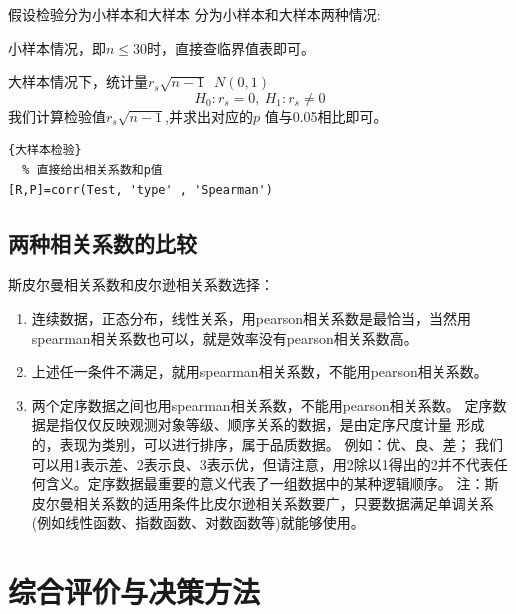 \documentclass[12pt]{ctexart}
\numberwithin{equation}{section} %
\begin{document}
假设检验分为小样本和大样本
分为小样本和大样本两种情况:

小样本情况，即$n\leq30$时，直接查临界值表即可。

大样本情况下，统计量$r_s\sqrt{n-1}$~$N(0,1)$
$$H_0:r_s=0,\:H_1:r_s\neq0$$
我们计算检验值$r_s\sqrt{n-1}$,并求出对应的$p$ 值与0.05相比即可。
\begin{lstlisting}{大样本检验}
  % 直接给出相关系数和p值
[R,P]=corr(Test, 'type' , 'Spearman')
\end{lstlisting}
\subsection{两种相关系数的比较}


斯皮尔曼相关系数和皮尔逊相关系数选择：
\begin{enumerate}
\item 连续数据，正态分布，线性关系，用pearson相关系数是最恰当，当然用
spearman相关系数也可以，就是效率没有pearson相关系数高。
\item 上述任一条件不满足，就用spearman相关系数，不能用pearson相关系数。
\item 两个定序数据之间也用spearman相关系数，不能用pearson相关系数。
定序数据是指仅仅反映观测对象等级、顺序关系的数据，是由定序尺度计量
形成的，表现为类别，可以进行排序，属于品质数据。
例如：优、良、差；
我们可以用1表示差、2表示良、3表示优，但请注意，用2除以1得出的2并不代表任何含义。定序数据最重要的意义代表了一组数据中的某种逻辑顺序。
注：斯皮尔曼相关系数的适用条件比皮尔逊相关系数要广，只要数据满足单调关系(例如线性函数、指数函数、对数函数等)就能够使用。
\end{enumerate}
\section{综合评价与决策方法}
\end{document}
